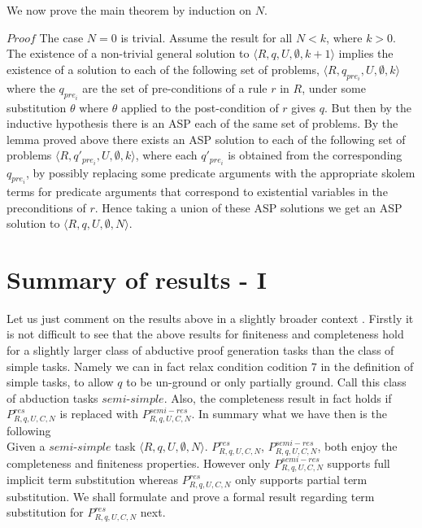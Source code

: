 We now prove the main theorem by induction on $N$. 

$Proof$ The case $N=0$ is trivial. Assume
the result for all $N<k$, where $k>0$. The existence of a non-trivial general solution
to $\langle R,q,U,\emptyset,k+1\rangle$ implies the existence of a solution to each of the following set of problems, $\langle R,q_{pre_{i}},U,\emptyset,k\rangle$ where the $q_{pre_{i}}$ are the set of
pre-conditions of a rule $r$ in $R$, under some substitution $\theta$ where
$\theta$ applied to the post-condition of $r$ gives $q$. But then by the
inductive hypothesis there is an ASP each of the same set of problems. By
the lemma proved above there exists an ASP solution to each of the following set of
problems $\langle R,q'_{pre_{i}},U,\emptyset,k\rangle$, where each
$q'_{pre_{i}}$ is obtained from the corresponding $q_{pre_{i}}$, by possibly
replacing some predicate arguments with the appropriate skolem terms for
predicate arguments that correspond to existential variables in the
preconditions of $r$. Hence taking a union of these ASP solutions we get an ASP solution to
$\langle R,q,U,\emptyset,N\rangle$.
\section{Summary of results - I}
Let us just comment on the results above in a slightly broader context . Firstly it is not difficult to see that the above results for finiteness and completeness hold for a slightly larger class of abductive proof generation tasks than the class of simple tasks. Namely we can in fact relax condition codition 7 in the definition of simple tasks, to allow $q$ to be un-ground or only partially ground. Call this class of abduction tasks $semi$-$simple$.  Also, the completeness result in fact holds if $P_{R,q,U,C,N}^{res}$ is replaced with $P_{R,q,U,C,N}^{semi-res}$. In summary what we have then is the following\\
Given a $\textit{semi-simple}$ task $\langle R,q,U,\emptyset,N\rangle$. $P_{R,q,U,C,N}^{res}$, $P_{R,q,U,C,N}^{semi-res}$, both enjoy the completeness and finiteness properties. However only $P_{R,q,U,C,N}^{semi-res}$ supports full implicit term substitution whereas $P_{R,q,U,C,N}^{res}$ only supports partial term substitution. We shall formulate and prove a formal result regarding term substitution for $P_{R,q,U,C,N}^{res}$ next.    

